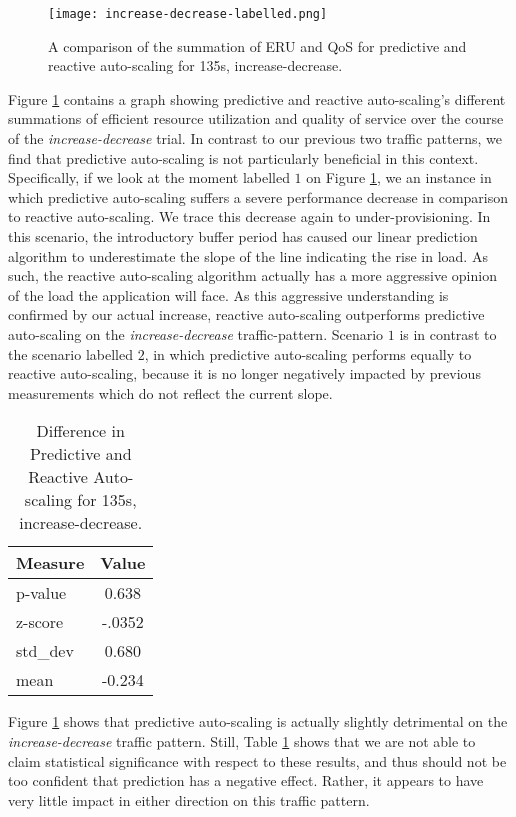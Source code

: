 \begin{figure}[!h]
  \centerline{\texttt{[image: increase-decrease-labelled.png]}}
  \caption{A comparison of the summation of ERU and QoS for
    predictive and reactive auto-scaling for 135s, increase-decrease.}
  \label{fig:135s-increase-decrease-labelled}
\end{figure}

Figure \ref{fig:135s-increase-decrease-labelled} contains a graph
showing predictive and reactive auto-scaling's different
summations of efficient resource utilization and quality of service over the
course of the \textit{increase-decrease} trial. In contrast to our previous two
traffic patterns, we find that predictive auto-scaling is not particularly
beneficial in this context. Specifically, if we look at the moment labelled
$1$ on Figure \ref{fig:135s-increase-decrease-labelled}, we an instance in which
predictive auto-scaling suffers a severe performance decrease in comparison to
reactive auto-scaling. We trace this decrease again to under-provisioning. In
this scenario, the introductory buffer period has caused our linear prediction
algorithm to underestimate the slope of the line indicating the rise in load. As
such, the reactive auto-scaling algorithm actually has a more aggressive opinion
of the load the application will face. As this aggressive understanding is
confirmed by our actual increase, reactive auto-scaling outperforms predictive
auto-scaling on the \textit{increase-decrease} traffic-pattern. Scenario
$1$ is in contrast to the scenario labelled $2$, in which predictive
auto-scaling performs equally to reactive auto-scaling, because it is no longer
negatively impacted by previous measurements which do not reflect the current
slope.

\begin{table}[htbp]
  \centering
  \caption{Difference in Predictive and Reactive Auto-scaling for 135s,
  increase-decrease.}
  \label{tab:135s-increase-decrease}
\begin{tabular}{l c}\hline\hline
    \multicolumn{1}{c}{\textbf{Measure}} & \textbf{Value} \\ \hline
     p-value & 0.638 \\
     z-score & -.0352 \\
     std\_dev & 0.680 \\
     mean & -0.234
  \end{tabular}
\end{table}

Figure \ref{fig:135s-increase-decrease-labelled} shows that predictive
auto-scaling is actually slightly detrimental on
the \textit{increase-decrease} traffic pattern.
Still, Table \ref{tab:135s-increase-decrease} shows that we are not able to claim
statistical significance with respect to these results, and thus should not be
too confident that prediction has a negative effect. Rather, it appears to
have very little impact in either direction on this traffic pattern.
